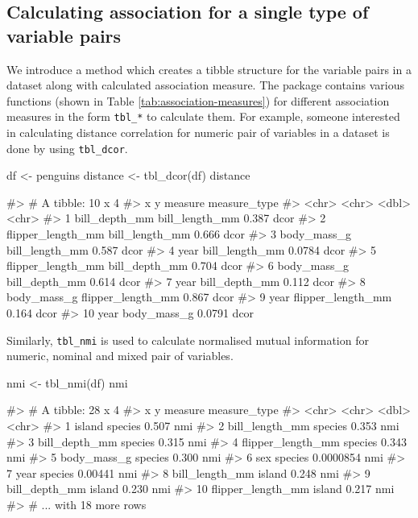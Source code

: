\hypertarget{calculating-association-for-a-single-type-of-variable-pairs}{%
\subsection{Calculating association for a single type of variable
pairs}\label{calculating-association-for-a-single-type-of-variable-pairs}}

We introduce a method which creates a tibble structure for the variable
pairs in a dataset along with calculated association measure. The
package contains various functions (shown in Table
\ref{tab:association-measures}) for different association measures in
the form \texttt{tbl\_*} to calculate them. For example, someone
interested in calculating distance correlation for numeric pair of
variables in a dataset is done by using \texttt{tbl\_dcor}.

\begin{Schunk}
\begin{Sinput}
df <- penguins
distance <- tbl_dcor(df)
distance
\end{Sinput}
\begin{Soutput}
#> # A tibble: 10 x 4
#>    x                 y                 measure measure_type
#>    <chr>             <chr>               <dbl> <chr>       
#>  1 bill_depth_mm     bill_length_mm     0.387  dcor        
#>  2 flipper_length_mm bill_length_mm     0.666  dcor        
#>  3 body_mass_g       bill_length_mm     0.587  dcor        
#>  4 year              bill_length_mm     0.0784 dcor        
#>  5 flipper_length_mm bill_depth_mm      0.704  dcor        
#>  6 body_mass_g       bill_depth_mm      0.614  dcor        
#>  7 year              bill_depth_mm      0.112  dcor        
#>  8 body_mass_g       flipper_length_mm  0.867  dcor        
#>  9 year              flipper_length_mm  0.164  dcor        
#> 10 year              body_mass_g        0.0791 dcor
\end{Soutput}
\end{Schunk}

Similarly, \texttt{tbl\_nmi} is used to calculate normalised mutual
information for numeric, nominal and mixed pair of variables.

\begin{Schunk}
\begin{Sinput}
nmi <- tbl_nmi(df)
nmi
\end{Sinput}
\begin{Soutput}
#> # A tibble: 28 x 4
#>    x                 y         measure measure_type
#>    <chr>             <chr>       <dbl> <chr>       
#>  1 island            species 0.507     nmi         
#>  2 bill_length_mm    species 0.353     nmi         
#>  3 bill_depth_mm     species 0.315     nmi         
#>  4 flipper_length_mm species 0.343     nmi         
#>  5 body_mass_g       species 0.300     nmi         
#>  6 sex               species 0.0000854 nmi         
#>  7 year              species 0.00441   nmi         
#>  8 bill_length_mm    island  0.248     nmi         
#>  9 bill_depth_mm     island  0.230     nmi         
#> 10 flipper_length_mm island  0.217     nmi         
#> # ... with 18 more rows
\end{Soutput}
\end{Schunk}

